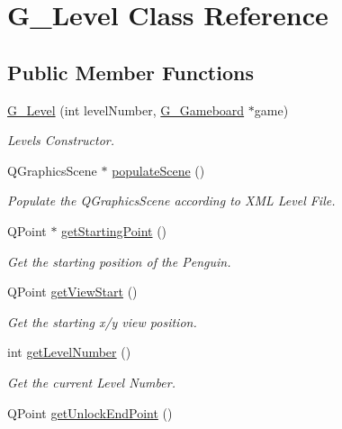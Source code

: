 \hypertarget{class_g___level}{}\section{G\+\_\+\+Level Class Reference}
\label{class_g___level}
\subsection*{Public Member Functions}
\begin{DoxyCompactItemize}
\item 
\hyperlink{class_g___level_a38ac069cc3b5490988f71aad58442581}{G\+\_\+\+Level} (int level\+Number, \hyperlink{class_g___gameboard}{G\+\_\+\+Gameboard} $\ast$game)
\begin{DoxyCompactList}\small\item\em Level\textquotesingle{}s Constructor. \end{DoxyCompactList}\item 
Q\+Graphics\+Scene $\ast$ \hyperlink{class_g___level_a3d34ee97aa649f7e72c6bb8a1fcd02a1}{populate\+Scene} ()
\begin{DoxyCompactList}\small\item\em Populate the Q\+Graphics\+Scene according to X\+M\+L Level File. \end{DoxyCompactList}\item 
Q\+Point $\ast$ \hyperlink{class_g___level_ae90beef96e5793703baf53667286ad56}{get\+Starting\+Point} ()
\begin{DoxyCompactList}\small\item\em Get the starting position of the Penguin. \end{DoxyCompactList}\item 
Q\+Point \hyperlink{class_g___level_a66909b5d2a0a5d0667a493dac8114572}{get\+View\+Start} ()
\begin{DoxyCompactList}\small\item\em Get the starting x/y view position. \end{DoxyCompactList}\item 
int \hyperlink{class_g___level_a4e25af74391b572f9a66865007078777}{get\+Level\+Number} ()
\begin{DoxyCompactList}\small\item\em Get the current Level Number. \end{DoxyCompactList}\item 
Q\+Point \hyperlink{class_g___level_a78fe48953fdd7e137c8282d4bc48f5f2}{get\+Unlock\+End\+Point} ()

\end{DoxyCompactItemize}
